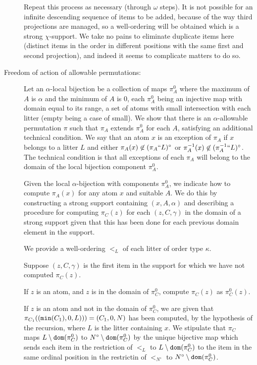 \documentclass[12pt]{article}
\begin{document}
\begin{description}
 Repeat this process as necessary (through $\omega$ steps).  It is not possible for an infinite descending sequence of items to be added, because of the way third projections are managed, so a well-ordering will be obtained which is a strong $\chi$-support.   We take no pains to eliminate duplicate items here (distinct items in the order in different positions with the same first and second projection), and indeed it seems to complicate matters to do so.

\item[Freedom of action of allowable permutations:]  Let an $\alpha$-local bijection be a collection of maps $\pi^0_A$ where the maximum of $A$ is $\alpha$ and the minimum of $A$ is 0,
each $\pi^0_A$  being an injective map with domain equal to its range, a set of atoms with small intersection with each litter (empty being a case of small).  We show that there is an $\alpha$-allowable permutation
$\pi$ such that $\pi_A$ extends $\pi^0_A$ for each $A$, satisfying an additional technical condition.  We say that an atom $x$ is an exception of $\pi_A$ if $x$ belongs to a litter $L$ and either $\pi_A(x) \not\in (\pi_A``L)^\circ$ or $\pi_A^{-1}(x) \not\in (\pi_A^{-1}``L)^\circ$.  The technical condition is that all exceptions of each $\pi_A$ will belong to the domain of the local bijection component $\pi^0_A$.

Given the local $\alpha$-bijection with components $\pi^0_A$, we indicate how to compute $\pi_A(x)$ for any atom $x$ and suitable $A$.  We do this by constructing a strong support
containing $(x,A,\alpha)$ and describing a procedure for computing $\pi_C(z)$ for each $(z,C,\gamma)$ in the domain of a strong support given that this has been done for each previous domain element in the support.

We provide a well-ordering $<_L$ of each litter of order type $\kappa$.

Suppose $(z,C,\gamma)$ is the first item in the support for which we have not computed $\pi_C(z)$.  

If $z$ is an atom, and $z$ is in the domain of $\pi^0_C$, compute $\pi_C(z)$ as
$\pi^0_C(z)$.

If $z$ is an atom and not in the domain of $\pi^0_C$, we are given that $\pi_{C_1}(({\tt min}(C_1),0,L)))=(C_1,0,N)$ has been computed, by the hypothesis of the recursion, where $L$ is the litter containing $x$.  We stipulate
that $\pi_C$ maps $L \setminus {\tt dom}(\pi^0_C)$ to $N^\circ \setminus {\tt dom}(\pi^0_C)$ by the unique bijective map which sends each item in the restriction of $<_L$ to  $L \setminus {\tt dom}(\pi^0_C)$ to the item in the same ordinal position in the restrictin of $<_{N^\circ}$ to $N^\circ \setminus {\tt dom}(\pi^0_C)$.


\end{description}
\end{document}

